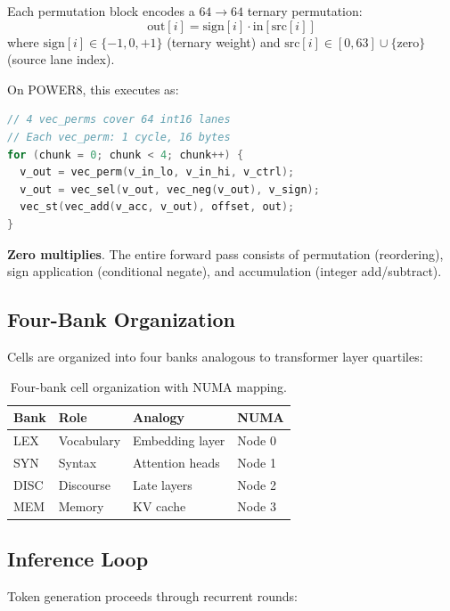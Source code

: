 \documentclass[10pt,twocolumn]{article}
\begin{document}
Each permutation block encodes a $64 \to 64$ ternary permutation:
\begin{equation}
\text{out}[i] = \text{sign}[i] \cdot \text{in}[\text{src}[i]]
\end{equation}
where $\text{sign}[i] \in \{-1, 0, +1\}$ (ternary weight) and $\text{src}[i] \in [0, 63] \cup \{\text{zero}\}$ (source lane index).

On POWER8, this executes as:
\begin{lstlisting}[language=C]
// 4 vec_perms cover 64 int16 lanes
// Each vec_perm: 1 cycle, 16 bytes
for (chunk = 0; chunk < 4; chunk++) {
  v_out = vec_perm(v_in_lo, v_in_hi, v_ctrl);
  v_out = vec_sel(v_out, vec_neg(v_out), v_sign);
  vec_st(vec_add(v_acc, v_out), offset, out);
}
\end{lstlisting}

\textbf{Zero multiplies}. The entire forward pass consists of permutation (reordering), sign application (conditional negate), and accumulation (integer add/subtract).

\subsection{Four-Bank Organization}

Cells are organized into four banks analogous to transformer layer quartiles:

\begin{table}[h]
\centering
\small
\begin{tabular}{llll}
\toprule
\textbf{Bank} & \textbf{Role} & \textbf{Analogy} & \textbf{NUMA} \\
\midrule
LEX & Vocabulary & Embedding layer & Node 0 \\
SYN & Syntax & Attention heads & Node 1 \\
DISC & Discourse & Late layers & Node 2 \\
MEM & Memory & KV cache & Node 3 \\
\bottomrule
\end{tabular}
\caption{Four-bank cell organization with NUMA mapping.}
\label{tab:banks}
\end{table}

\subsection{Inference Loop}

Token generation proceeds through recurrent rounds:
\end{document}
